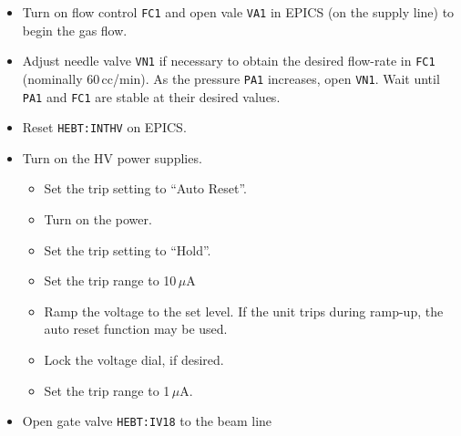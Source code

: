 \begin{itemize}
\item Turn on flow control \texttt{FC1} and open vale \texttt{VA1} in EPICS (on the supply line) to begin the gas flow.
\item Adjust needle valve \texttt{VN1} if necessary to obtain the desired flow-rate in \texttt{FC1} (nominally 60\,cc/min).  As the pressure \texttt{PA1} increases, open \texttt{VN1}. Wait until \texttt{PA1} and \texttt{FC1} are stable at their desired values.
\item Reset \texttt{HEBT:INTHV} on EPICS.
\item Turn on the HV power supplies.
\begin{itemize}
\setlength{\itemsep}{0pt}
\setlength{\parskip}{0pt}
\setlength{\parsep}{0pt}
\item Set the trip setting  to ``Auto Reset''.
\item Turn on the power.
\item Set the trip setting to ``Hold''.
\item Set the trip range to 10\,$\mu$A
\item Ramp the voltage to the set level.  If the unit trips during ramp-up, the auto reset function may be used. 
\item Lock the voltage dial, if desired.
\item Set the trip range to 1\,$\mu$A.
\end{itemize}
\item Open gate valve \texttt{HEBT:IV18} to the beam line
\end{itemize}

